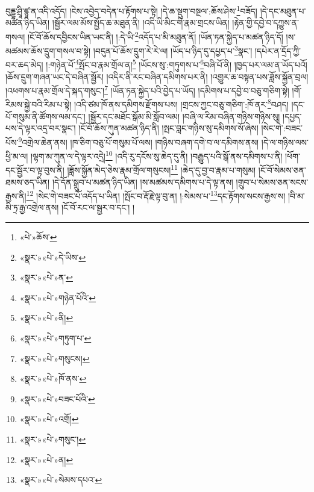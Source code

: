 བུདྡྷ་ཤྲཱི་ཛྙཱ་ན་འདི་འདོད། །ངེས་འབྱེད་བདེན་པ་རྟོགས་པ་སྟེ། །དེ་ཆ་སྡུག་བསྔལ་:ཆོས་ཤེས་\footnote{«པེ་»ཆོས་}བཟོད། །དེ་དང་མཐུན་པ་མཚན་ཉིད་ཡིན། །སྦྱོར་ལམ་མོས་སྤྱོད་ཆ་མཐུན་ནི། །འདི་ཡི་མིང་གི་རྣམ་གྲངས་ཡིན། །རྟེན་གྱི་དབྱེ་བ་དཀྱུས་ན་གསལ། །ངོ་བོ་ཆོས་དབྱིངས་ཡིན་ཡང་ནི། །:དེ་ཡི་\footnote{«སྣར་»«པེ་»དེ་ཡིས་}འདོད་པ་མི་མཐུན་ནོ། །ཡོན་ཏན་སྐྱེད་པ་མཚན་ཉིད་དོ། །ས་མཚམས་ཆོས་དྲུག་གསལ་བ་སྟེ། །བདུན་པོ་ཆོས་དྲུག་རེ་རེ་ལ། །ཡོད་པ་ཉིད་དུ་དཔྱད་པ་\footnote{«སྣར་»«པེ་»ན་}སྣང་། །དཔེར་ན་དྲོད་ཀྱི་བར་ཆད་མེད། །:གཉེན་པོ་\footnote{«སྣར་»«པེ་»གཉེན་པོའི་}སྤོང་བ་རྣམ་གྲོལ་ན།\footnote{«སྣར་»«པེ་»ནི།} །ཡོངས་སུ་:གཏུགས་པ་\footnote{«སྣར་»«པེ་»གཏུག་པ་}བཞི་པོ་ནི། །ཁྱད་པར་ལམ་ན་ཡོད་པའོ། །ཆོས་དྲུག་གཞན་ཡང་དེ་བཞིན་སྦྱོར། །འདིར་ནི་རང་བཞིན་དམིགས་པར་ནི། །འགྱུར་ཆ་བསྟན་པས་ཟློས་སྐྱོན་བྲལ། །འཕགས་པ་རྣམ་གྲོལ་དེ་སྐད་གསུང་།\footnote{«སྣར་»«པེ་»གསུངས།} །ཡོན་ཏན་སྐྱེད་པའི་བྱེད་པ་ཡོད། །དམིགས་པ་དབྱེ་བ་བཅུ་གཅིག་སྟེ། །གོ་རིམས་སྐྱེ་བའི་རིམ་པ་སྟེ། །འདི་ཙམ་ཁོ་ནས་དམིགས་རྫོགས་པས། །གྲངས་ཀྱང་བཅུ་གཅིག་:ཁོ་ནར་\footnote{«སྣར་»«པེ་»ཁོ་ནས་}བཤད། །དང་པོ་གསུམ་ནི་ཚོགས་ལམ་དང་། །སྦྱོར་དང་མཐོང་སྒོམ་མི་སློབ་ལམ། །བཞི་ལ་རིམ་བཞིན་གཉིས་གཉིས་སུ། །དཔྱད་པས་དེ་ལྟར་འདྲ་བར་སྣང་། །ངོ་བོ་ཆོས་ཀུན་མཚན་ཉིད་ནི། །སྤང་བླང་གཉིས་སུ་དམིགས་སོ་ཞེས། །སེང་གེ་:བཟང་པོས་\footnote{«སྣར་»«པེ་»བཟང་པོའི་}འགྲེལ་ཆེན་ནས། །ཁ་ཅིག་བཅུ་པོ་གསུམ་པོ་ལས། །གཉིས་བཞག་དགེ་བ་ལ་དམིགས་ནས། །དེ་ལ་གཉིས་ལས་ཕྱི་མ་ལ། །ལྷག་མ་ཀུན་ལ་དེ་ལྟར་འདྲེ།\footnote{«སྣར་»«པེ་»འགྲོ།} །འདི་རུ་དངོས་སུ་ཆེད་དུ་ནི། །བརྒྱུད་པའི་སྒོ་ནས་དམིགས་པ་ནི། །ཕོག་དང་སྦྱོར་བ་ལྟ་བུས་ནི། །ཟློས་སྐྱོན་མེད་ཅེས་རྣམ་གྲོལ་གསུངས།\footnote{«སྣར་»«པེ་»གསུང་།} །ཆེད་དུ་བྱ་བ་རྣམ་པ་གསུམ། །ངོ་བོ་སེམས་ཅན་ཐམས་ཅད་ཡིན། །དེ་དོན་སྒྲུབ་པ་མཚན་ཉིད་ཡིན། །ས་མཚམས་དམིགས་པ་དེ་ལྟ་ནས། །གྲུབ་པ་སེམས་ཅན་སངས་རྒྱས་ནི།\footnote{«སྣར་»«པེ་»ན།} །སེང་གེ་བཟང་པོ་འདོད་པ་ཡིན། །སྤོང་བ་རྡོ་རྗེ་ལྟ་བུ་ན། །:སེམས་པ་\footnote{«སྣར་»«པེ་»སེམས་དཔའ་}དང་རྟོགས་སངས་རྒྱས་ས། །བི་མ་མི་ཏྲ་རྒྱ་འགྲེལ་ནས། །ངོ་བོ་རང་ལ་སྦྱར་བ་དང་། །
